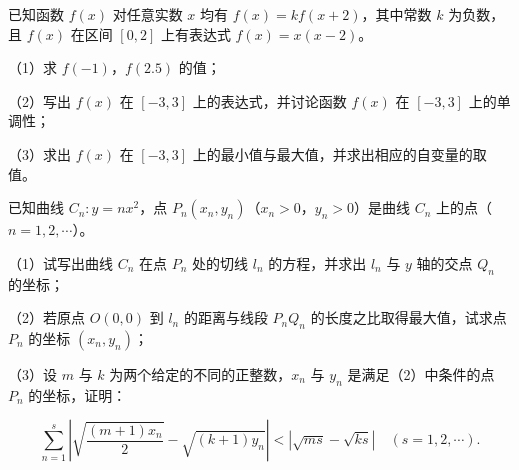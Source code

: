 \begin{question}
已知函数 $f(x)$ 对任意实数 $x$ 均有 $f(x)=kf(x+2)$，其中常数 $k$ 为负数，且 $f(x)$ 在区间 $[0,2]$ 上有表达式 $f(x)=x(x-2)$。

（1）求 $f(-1)$，$f(2.5)$ 的值；

（2）写出 $f(x)$ 在 $[-3,3]$ 上的表达式，并讨论函数 $f(x)$ 在 $[-3,3]$ 上的单调性；

（3）求出 $f(x)$ 在 $[-3,3]$ 上的最小值与最大值，并求出相应的自变量的取值。

\end{question}
\begin{question}
已知曲线 $C_n:y=nx^2$，点 $P_n(x_n,y_n)$（$x_n>0$，$y_n>0$）是曲线 $C_n$ 上的点（$n=1,2,\cdots$）。

（1）试写出曲线 $C_n$ 在点 $P_n$ 处的切线 $l_n$ 的方程，并求出 $l_n$ 与 $y$ 轴的交点 $Q_n$ 的坐标；

（2）若原点 $O(0,0)$ 到 $l_n$ 的距离与线段 $P_nQ_n$ 的长度之比取得最大值，试求点 $P_n$ 的坐标 $(x_n,y_n)$；

（3）设 $m$ 与 $k$ 为两个给定的不同的正整数，$x_n$ 与 $y_n$ 是满足（2）中条件的点 $P_n$ 的坐标，证明：

\nopagebreak[4]
\[\sum_{n=1}^s\left|\sqrt{\frac{(m+1)x_n}{2}}-\sqrt{(k+1)y_n}\right|<\left|\sqrt{ms}-\sqrt{ks}\right|\quad(s=1,2,\cdots).\]

\end{question}